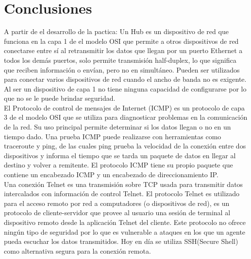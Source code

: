 
\section{Conclusiones}
A partir de el desarrollo de la pactica:
Un Hub es un dispositivo de red que funciona
en la capa 1 de el modelo OSI que permite
a otros dispositivos de red conectarse entre 
sí al retransmitir los datos que llegan por 
un puerto Ethernet a todos los demás puertos, 
solo permite transmisión half-duplex, lo que significa
que reciben información o envían, pero no en simultáneo.
Pueden ser utilizados para conectar varios dispositivos 
de red cuando el ancho de banda no es exigente.\cite{hub_coursera}
Al ser un dispositivo de capa 1 no tiene ninguna
capacidad de configurarse por lo que no se le puede brindar seguridad.
\\
El Protocolo de control de mensajes de Internet (ICMP)
es un protocolo de capa 3 de el modelo OSI que se utiliza para 
diagnosticar problemas en la comunicación de la red.
Su uso principal permite determinar si los datos llegan o no 
en un tiempo dado. Una prueba ICMP puede 
realizarse con herramientas como traceroute y ping, de las cuales ping
prueba la velocidad de la conexión entre dos dispositivos y informa el 
tiempo que se tarda un paquete de datos en llegar al destino y volver a remitente.
El protocolo ICMP tiene su propio paquete que contiene un encabezado ICMP y un
encabezado de direccionamiento IP.\cite{icmp_cloudflare}
\\
Una conexión Telnet es una transmisión sobre TCP usada para transmitir datos
intercalados con información de control Telnet.\cite{telnet_RFC} El protocolo Telnet es utilizado
para el acceso remoto por red a computadores (o dispositivos de red), es un protocolo
de cliente-servidor que provee al usuario una sesión de terminal  al dispositivo 
remoto desde la aplicación Telnet del cliente. Este protocolo no ofrece ningún tipo
de seguridad por lo que es vulnerable a ataques en los que un agente pueda escuchar 
los datos transmitidos. Hoy en día se utiliza SSH(Secure Shell) como alternativa
segura para la conexión remota.\cite{telnet_shh_academy}
\\